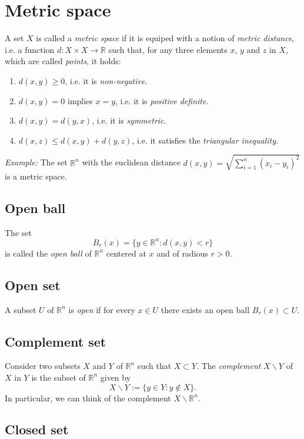 \documentclass[aps,prl,twocolumn,groupedaddress]{revtex4-2}
\newcommand{\RR}{\mathbb{R}}
\begin{document}
\section{Metric space}

A set $X$ is called a {\em metric space} if it is equiped with a notion of {\em metric distance}, i.e. a function $d:X\times X\to \RR$ such that, for any three elements $x$, $y$ and $z$ in $X$, which are called {\em points}, it holds:
\begin{enumerate}
\item $d(x,y) \geq 0$, i.e. it is {\em non-negative}.
\item $d(x,y) = 0$ implies $x=y$, i.e. it is {\em positive definite}.
\item $d(x,y) = d(y,x)$, i.e. it is {\em symmetric}.
\item $d(x,z) \leq  d(x,y) + d(y,z)$, i.e. it satisfies the {\em triangular inequality}.
\end{enumerate}

{\em Example:} The set $\RR^n$ with the euclidean distance $d(x,y) = \sqrt{\sum_{i=1}^n (x_i-y_i)^2}$ is a metric space.

\subsection{Open ball}

The set
$$
B_r(x)
=
\{y\in \RR^n: d(x,y)<r\}
$$
is called the {\em open ball} of $\RR^n$ centered at $x$ and of radious $r>0$.

\subsection{Open set}

A subset $U$ of $\RR^n$ is {\em open} if for every $x\in U$ there exists an open ball $B_r(x) \subset U$.

\subsection{Complement set}

Consider two subsets $X$ and $Y$ of $\RR^n$ such that $X\subset Y$.
The {\em complement} $X\backslash Y$ of $X$ in $Y$ is the subset of $\RR^n$ given by
$$
X\backslash Y := \{y\in Y:y\notin X\}.
$$
In particular, we can think of the complement $X\backslash \RR^n$.

\subsection{Closed set}
\end{document}
